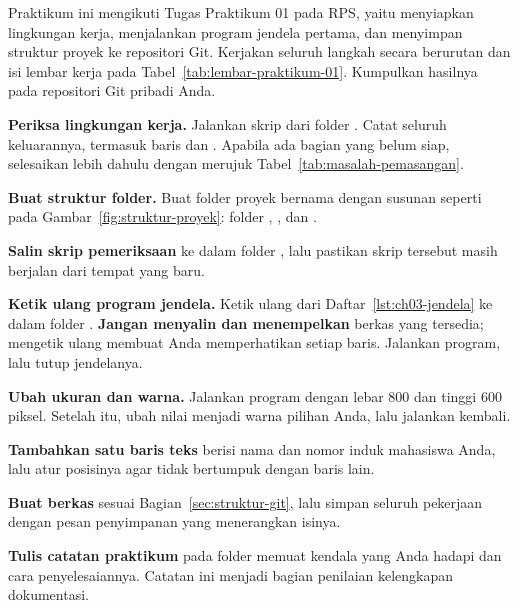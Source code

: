 \begin{praktikumbox}
Praktikum ini mengikuti Tugas Praktikum 01 pada RPS, yaitu menyiapkan
lingkungan kerja, menjalankan program jendela pertama, dan menyimpan struktur
proyek ke repositori Git. Kerjakan seluruh langkah secara berurutan dan isi
lembar kerja pada Tabel~\ref{tab:lembar-praktikum-01}. Kumpulkan hasilnya pada
repositori Git pribadi Anda.

\begin{langkah}
  \item \textbf{Periksa lingkungan kerja.} Jalankan skrip
         dari folder . Catat
        seluruh keluarannya, termasuk baris  dan
        . Apabila ada bagian yang belum siap,
        selesaikan lebih dahulu dengan merujuk
        Tabel~\ref{tab:masalah-pemasangan}.

  \item \textbf{Buat struktur folder.} Buat folder proyek bernama
         dengan susunan seperti pada
        Gambar~\ref{fig:struktur-proyek}: folder ,
        , dan .

  \item \textbf{Salin skrip pemeriksaan} ke dalam folder , lalu
        pastikan skrip tersebut masih berjalan dari tempat yang baru.

  \item \textbf{Ketik ulang program jendela.} Ketik ulang
         dari Daftar~\ref{lst:ch03-jendela} ke dalam
        folder . \textbf{Jangan menyalin dan menempelkan} berkas
        yang tersedia; mengetik ulang membuat Anda memperhatikan setiap baris.
        Jalankan program, lalu tutup jendelanya.

  \item \textbf{Ubah ukuran dan warna.} Jalankan program dengan lebar 800 dan
        tinggi 600 piksel. Setelah itu, ubah nilai  menjadi
        warna pilihan Anda, lalu jalankan kembali.

  \item \textbf{Tambahkan satu baris teks} berisi nama dan nomor induk
        mahasiswa Anda, lalu atur posisinya agar tidak bertumpuk dengan baris
        lain.

  \item \textbf{Buat berkas } sesuai
        Bagian~\ref{sec:struktur-git}, lalu simpan seluruh pekerjaan dengan
        pesan penyimpanan yang menerangkan isinya.

  \item \textbf{Tulis catatan praktikum} pada folder  memuat
        kendala yang Anda hadapi dan cara penyelesaiannya. Catatan ini menjadi
        bagian penilaian kelengkapan dokumentasi.
\end{langkah}
\end{praktikumbox}

